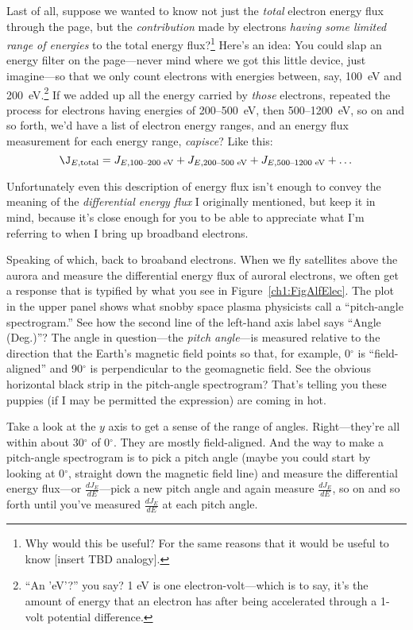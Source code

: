 Last of all, suppose we wanted to know not just the \emph{total}
electron energy flux through the page, but the \emph{contribution}
made by electrons \emph{having some limited range of energies} to the
total energy flux?\footnote{Why would this be useful?  For the same
  reasons that it would be useful to know [insert TBD analogy].}
Here's an idea: You could slap an energy filter on the page---never
mind where we got this little device, just imagine---so that we only
count electrons with energies between, say, 100~eV and
200~eV.\footnote{``An 'eV'?''  you say? 1 eV is one
  electron-volt---which is to say, it's the amount of energy that an
  electron has after being accelerated through a 1-volt potential
  difference.} If we added up all the energy carried by \emph{those}
electrons, repeated the process for electrons having energies of
200--500~eV, then 500--1200~eV, so on and so forth, we'd have a list
of electron energy ranges, and an energy flux measurement for each
energy range, \emph{capisce}? Like this:
\begin{equation}
  \label{ch1:eqeFlux}
  \J_{E,\textrm{total}} = J_{E,\textrm{100--200 eV}} + J_{E,\textrm{200--500 eV}} + J_{E,\textrm{500--1200 eV}} + \dots
\end{equation}

Unfortunately even this description of energy flux isn't enough to
convey the meaning of the \emph{differential energy flux} I originally
mentioned, but keep it in mind, because it's close enough for you to
be able to appreciate what I'm referring to when I bring up broadband
electrons.

Speaking of which, back to broaband electrons. When we fly satellites
above the aurora and measure the differential energy flux of auroral
electrons, we often get a response that is typified by what you see in
Figure~\ref{ch1:FigAlfElec}. The plot in the upper panel shows what
snobby space plasma physicists call a ``pitch-angle spectrogram.''
See how the second line of the left-hand axis label says ``Angle
(Deg.)''?  The angle in question---the \emph{pitch angle}---is
measured relative to the direction that the Earth's magnetic field
points so that, for example, 0$^\circ$ is ``field-aligned'' and
90$^\circ$ is perpendicular to the geomagnetic field. See the obvious
horizontal black strip in the pitch-angle spectrogram? That's telling
you these puppies (if I may be permitted the expression) are coming in
hot.

Take a look at the $y$ axis to get a sense of the range of
angles. Right---they're all within about 30$^\circ$ of 0$^\circ$. They
are mostly field-aligned. And the way to make a pitch-angle
spectrogram is to pick a pitch angle (maybe you could start by looking
at 0$^\circ$, straight down the magnetic field line) and measure the
differential energy flux---or $\frac{d J_E}{dE}$---pick a new pitch
angle and again measure $\frac{d J_E}{dE}$, so on and so forth until
you've measured $\frac{d J_E}{dE}$ at each pitch angle.

